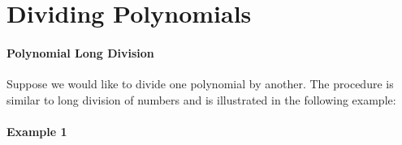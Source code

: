 \section{Dividing Polynomials}
\label{sec:dividing-polynomials}

\paragraph{Polynomial Long Division}

Suppose we would like to divide one polynomial by another. The procedure is similar to long division of numbers and is illustrated in the following example:

\paragraph{Example 1}

